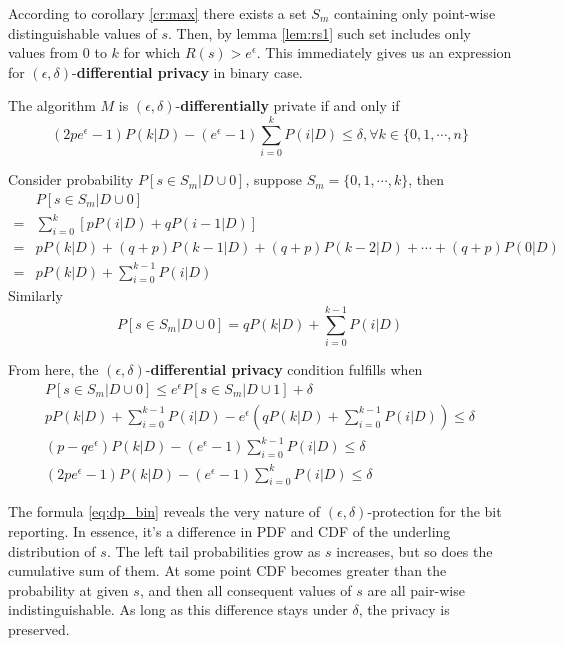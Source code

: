 \documentclass[11pt]{article}
\begin{document}
According to corollary \ref{cr:max} there exists a set $S_m$ containing only point-wise distinguishable values of $s$.  Then, by lemma \ref{lem:rs1} such set includes only values from 0 to $k$ for which $R(s) > e^\epsilon$.   This immediately gives us an expression for $(\epsilon,\delta)$-\textbf{differential privacy}  in binary case.
\begin{lem} \label{lem:dp_bin}
The algorithm $M$ is $(\epsilon,\delta)$-\textbf{differentially} private if and only if   
\begin{equation} \label{eq:dp_bin}
(2pe^\epsilon - 1)P(k | D ) - (e^\epsilon - 1) \sum^{k} _{i=0}P(i|D) \le \delta, \forall k \in \{0,1,\cdots, n\}
\end{equation}
\begin{pf}
Consider probability $P[s \in S_m|D \cup 0]$, suppose $S_m = \{0,1, \cdots, k\}$, then
\begin{align*}
 & P[s \in S_m|D \cup 0]   \\
 = & \sum^k_{i=0} \left [ p P(i | D ) + q P( i - 1 | D) \right ]  \\
 = & p P(k | D )  + (q+p)P(k-1|D) + (q+p)P(k-2|D) + \cdots + (q+p)P(0|D)  \\
 = & p  P(k | D )  + \sum_{i=0}^{k-1} P(i|D) 
\end{align*}
Similarly
\[ P[s \in S_m|D \cup 0] = q  P(k | D )  + \sum^{k-1} _{i=0}P(i|D) \]

From here, the $(\epsilon,\delta)$-\textbf{differential privacy} condition fulfills when
\begin{align}
P[s \in S_m|D \cup 0] \le e^{\epsilon}P[s \in S_m|D \cup 1] + \delta   \\
p  P(k | D )  + \sum_{i=0}^{k-1} P(i|D) - e^\epsilon \left ( q  P(k | D )  + \sum^{k-1} _{i=0}P(i|D) \right ) \le \delta \\
(p - qe^\epsilon)P(k | D ) - (e^\epsilon - 1) \sum^{k-1} _{i=0}P(i|D) \le \delta \\
(2pe^\epsilon - 1)P(k | D ) - (e^\epsilon - 1) \sum^{k} _{i=0}P(i|D) \le \delta
\end{align}
\end{pf}
\end{lem}

The formula \ref{eq:dp_bin} reveals the very nature of  $(\epsilon,\delta)$-protection for the bit reporting. In essence, it's a difference in PDF and CDF of the underling distribution of $s$.  The left tail probabilities grow as $s$ increases, but so does the cumulative sum of them.  At some point CDF becomes greater than the probability at given $s$, and then all consequent values of $s$ are all pair-wise indistinguishable.  As long as this difference stays under $\delta$, the privacy is preserved.
\end{document}
